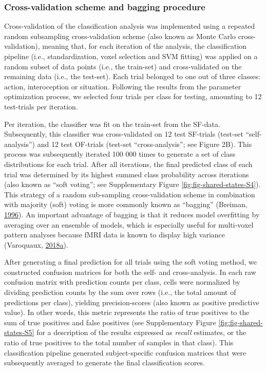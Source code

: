 \documentclass[11pt,american,]{memoir} %
\begin{document}
\hypertarget{shared-states-methods-mvpa-cv-and-bagging}{%
\subsubsection{Cross-validation scheme and bagging procedure}\label{shared-states-methods-mvpa-cv-and-bagging}}

Cross-validation of the classification analysis was implemented using a repeated random subsampling cross-validation scheme (also known as Monte Carlo cross-validation), meaning that, for each iteration of the analysis, the classification pipeline (i.e., standardization, voxel selection and SVM fitting) was applied on a random subset of data points (i.e., the train-set) and cross-validated on the remaining data (i.e., the test-set). Each trial belonged to one out of three classes: action, interoception or situation. Following the results from the parameter optimization process, we selected four trials per class for testing, amounting to 12 test-trials per iteration.

Per iteration, the classifier was fit on the train-set from the SF-data. Subsequently, this classifier was cross-validated on 12 test SF-trials (test-set ``self-analysis'') and 12 test OF-trials (test-set ``cross-analysis''; see Figure 2B). This process was subsequently iterated 100 000 times to generate a set of class distributions for each trial. After all iterations, the final predicted class of each trial was determined by its highest summed class probability across iterations (also known as ``soft voting''; see Supplementary Figure \ref{fig:fig-shared-states-S4}). This strategy of a random sub-sampling cross-validation scheme in combination with majority (soft) voting is more commonly known as ``bagging'' (Breiman, \protect\hyperlink{ref-breiman1996bagging}{1996}). An important advantage of bagging is that it reduces model overfitting by averaging over an ensemble of models, which is especially useful for multi-voxel pattern analyses because fMRI data is known to display high variance (Varoquaux, \protect\hyperlink{ref-varoquaux2018cross}{2018}\protect\hyperlink{ref-varoquaux2018cross}{a}).

After generating a final prediction for all trials using the soft voting method, we constructed confusion matrices for both the self- and cross-analysis. In each raw confusion matrix with prediction counts per class, cells were normalized by dividing prediction counts by the sum over rows (i.e., the total amount of predictions per class), yielding precision-scores (also known as positive predictive value). In other words, this metric represents the ratio of true positives to the sum of true positives and false positives (see Supplementary Figure \ref{fig:fig-shared-states-S5} for a description of the results expressed as \emph{recall} estimates, or the ratio of true positives to the total number of samples in that class). This classification pipeline generated subject-specific confusion matrices that were subsequently averaged to generate the final classification scores.
\end{document}
